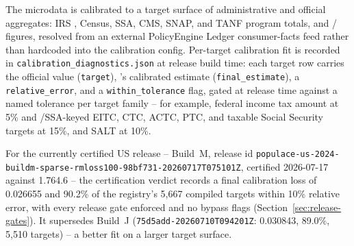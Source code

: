 The microdata is calibrated to a target surface of administrative and
official aggregates: IRS \soi{}, Census, SSA, CMS, SNAP, and TANF program
totals, and \cbo{}/\jct{} figures, resolved from an external PolicyEngine
Ledger consumer-facts feed rather than hardcoded into the calibration
config.
Per-target calibration fit is recorded in \texttt{calibration\_diagnostics.json}
at release build time: each target row carries the official value
(\texttt{target}), \policyengineus{}'s calibrated estimate
(\texttt{final\_estimate}), a \texttt{relative\_error}, and a
\texttt{within\_tolerance} flag, gated at release time against a named
tolerance per target family -- for example, federal income tax amount at
5\% and \soi{}/SSA-keyed EITC, CTC, ACTC, PTC, and taxable Social Security
targets at 15\%, and SALT at 10\%.

For the currently certified US release -- Build~M, release id
\texttt{populace-us-2024-buildm-sparse-rmloss100-98bf731-20260717T075101Z},
certified 2026-07-17 against \policyengineus{} 1.764.6 -- the
certification verdict records a final calibration loss of 0.026655 and
90.2\% of the registry's 5{,}667 compiled targets within 10\% relative
error, with every release gate enforced and no bypass flags
(Section~\ref{sec:release-gates}). It supersedes Build~J
(\texttt{75d5add-20260710T094201Z}: 0.030843, 89.0\%, 5{,}510 targets)
-- a better fit on a larger target surface.


